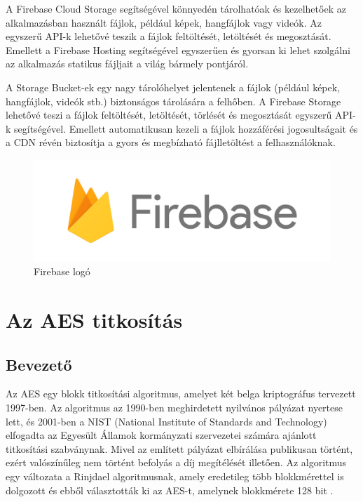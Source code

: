A Firebase Cloud Storage segítségével könnyedén tárolhatóak és kezelhetőek az alkalmazásban használt fájlok, például képek, hangfájlok vagy videók. Az egyszerű API-k lehetővé teszik a fájlok feltöltését, letöltését és megosztását. Emellett a Firebase Hosting segítségével egyszerűen és gyorsan ki lehet szolgálni az alkalmazás statikus fájljait a világ bármely pontjáról.

A Storage Bucket-ek egy nagy tárolóhelyet jelentenek a fájlok (például képek, hangfájlok, videók stb.) biztonságos tárolására a felhőben. A Firebase Storage lehetővé teszi a fájlok feltöltését, letöltését, törlését és megosztását egyszerű API-k segítségével. Emellett automatikusan kezeli a fájlok hozzáférési jogosultságait és a CDN révén biztosítja a gyors és megbízható fájlletöltést a felhasználóknak.

\begin{figure}[!h]
	\centering
	\includegraphics[scale=0.1]{images/firebaseLogo}
	\caption{Firebase logó}
	\label{abra:firebaseLogo}
\end{figure}

\section {Az AES titkosítás}
\subsection {Bevezető}

Az AES egy blokk titkosítási algoritmus, amelyet két belga kriptográfus tervezett 1997-ben. Az algoritmus az 1990-ben meghirdetett nyilvános pályázat nyertese lett, és 2001-ben a NIST (National Institute of Standards and Technology) elfogadta az Egyesült Államok kormányzati szervezetei számára ajánlott titkosítási szabványnak. Mivel az említett pályázat elbírálása publikusan történt, ezért valószínűleg nem történt befolyás a díj megítélését illetően. Az algoritmus egy változata a Rinjdael algoritmusnak, amely eredetileg több blokkmérettel is dolgozott és ebből választották ki az AES-t, amelynek blokkmérete 128 bit \cite{AES}.

